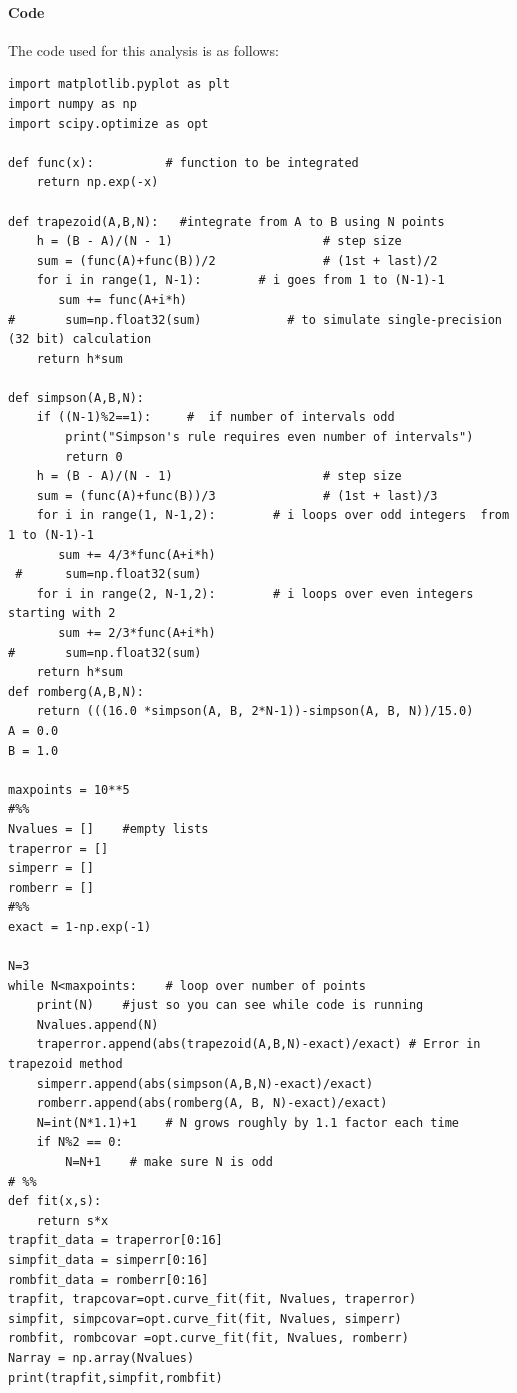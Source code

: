 \documentclass[aps,prb,groupedaddress,nofootinbib,floatfix]{revtex4}
\begin{document}
\paragraph{Code} 
The code used for this analysis is as follows:
\begin{lstlisting}
import matplotlib.pyplot as plt 
import numpy as np
import scipy.optimize as opt

def func(x):          # function to be integrated
    return np.exp(-x)

def trapezoid(A,B,N):   #integrate from A to B using N points
    h = (B - A)/(N - 1)                     # step size 
    sum = (func(A)+func(B))/2               # (1st + last)/2
    for i in range(1, N-1):        # i goes from 1 to (N-1)-1
       sum += func(A+i*h)
#       sum=np.float32(sum)            # to simulate single-precision (32 bit) calculation
    return h*sum  

def simpson(A,B,N):
    if ((N-1)%2==1):     #  if number of intervals odd
        print("Simpson's rule requires even number of intervals")
        return 0
    h = (B - A)/(N - 1)                     # step size 
    sum = (func(A)+func(B))/3               # (1st + last)/3
    for i in range(1, N-1,2):        # i loops over odd integers  from 1 to (N-1)-1
       sum += 4/3*func(A+i*h)
 #      sum=np.float32(sum)
    for i in range(2, N-1,2):        # i loops over even integers starting with 2
       sum += 2/3*func(A+i*h)
#       sum=np.float32(sum)
    return h*sum  
def romberg(A,B,N):
    return (((16.0 *simpson(A, B, 2*N-1))-simpson(A, B, N))/15.0)
A = 0.0
B = 1.0

maxpoints = 10**5
#%%
Nvalues = []    #empty lists
traperror = []
simperr = []
romberr = []
#%%
exact = 1-np.exp(-1)

N=3
while N<maxpoints:    # loop over number of points
    print(N)    #just so you can see while code is running
    Nvalues.append(N)
    traperror.append(abs(trapezoid(A,B,N)-exact)/exact) # Error in trapezoid method
    simperr.append(abs(simpson(A,B,N)-exact)/exact)
    romberr.append(abs(romberg(A, B, N)-exact)/exact)
    N=int(N*1.1)+1    # N grows roughly by 1.1 factor each time
    if N%2 == 0:
        N=N+1    # make sure N is odd
# %%
def fit(x,s):
    return s*x
trapfit_data = traperror[0:16]
simpfit_data = simperr[0:16]
rombfit_data = romberr[0:16]
trapfit, trapcovar=opt.curve_fit(fit, Nvalues, traperror)
simpfit, simpcovar=opt.curve_fit(fit, Nvalues, simperr)
rombfit, rombcovar =opt.curve_fit(fit, Nvalues, romberr)
Narray = np.array(Nvalues)
print(trapfit,simpfit,rombfit)


\end{lstlisting}
\end{document}
